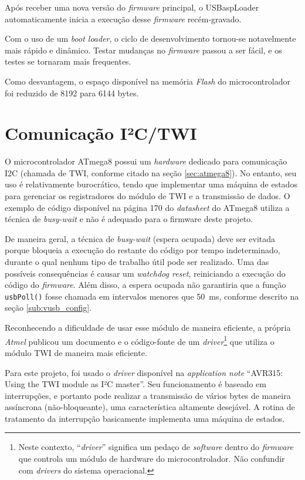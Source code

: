 \documentclass[brazil,pagestart=firstchapter]{abnt}
\begin{document}
Após receber uma nova versão do \textit{firmware} principal, o USBaspLoader
automaticamente inicia a execução desse \textit{firmware} recém-gravado.

Com o uso de um \textit{boot loader}, o ciclo de desenvolvimento tornou-se
notavelmente mais rápido e dinâmico. Testar mudanças no \textit{firmware}
passou a ser fácil, e os testes se tornaram mais frequentes.

Como desvantagem, o espaço disponível na memória \textit{Flash} do
microcontrolador foi reduzido de \num{8192} para \num{6144} bytes.


\section{Comunicação I²C/TWI}
\label{sec:twi}

O microcontrolador ATmega8 possui um \textit{hardware} dedicado para
comunicação \ac{I2C} (chamada de \ac{TWI}, conforme citado na seção
\ref{sec:atmega8}). No entanto, seu uso é relativamente burocrático, tendo
que implementar uma máquina de estados para gerenciar os registradores do
módulo de \ac{TWI} e a transmissão de dados. \cite[p.~168]{ATmega8} O
exemplo de código disponível na página 170 do \textit{datasheet} do ATmega8
utiliza a técnica de \textit{busy-wait} e não é adequado para o firmware
deste projeto.

De maneira geral, a técnica de \textit{busy-wait} (espera ocupada) deve
ser evitada porque bloqueia a execução do restante do código por tempo
indeterminado, durante o qual nenhum tipo de trabalho útil pode ser
realizado. Uma das possíveis consequências é causar um \textit{watchdog
reset}, reiniciando a execução do código do \textit{firmware}. Além disso,
a espera ocupada não garantiria que a função \texttt{usbPoll()} fosse
chamada em intervalos menores que \SI{50}{\milli\second}, conforme descrito
na seção \ref{sub:vusb_config}.

Reconhecendo a dificuldade de usar esse módulo de maneira eficiente, a
própria \textit{Atmel} publicou um documento e o código-fonte de um
\textit{driver}\footnote{
	Neste contexto, ``\textit{driver}'' significa um pedaço de
	\textit{software} dentro do \textit{firmware} que controla um módulo de
	hardware do microcontrolador. Não confundir com \textit{drivers} do
	sistema operacional.}
que utiliza o módulo \ac{TWI} de maneira mais eficiente. \cite{AVR315}

Para este projeto, foi usado o \textit{driver} disponível na
\textit{application note} ``AVR315: Using the TWI module as I²C master''.
Seu funcionamento é baseado em interrupções, e portanto pode realizar a
transmissão de vários bytes de maneira assíncrona (não-bloqueante), uma
característica altamente desejável. A rotina de tratamento da interrupção
basicamente implementa uma máquina de estados. \cite[p.~13]{AVR315}
\end{document}
